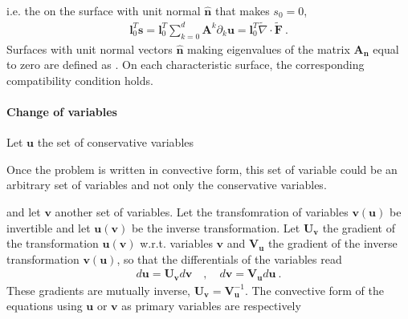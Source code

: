 \documentclass[letterpaper,10pt,english]{jupyterBook}
\begin{document}
\sphinxAtStartPar
i.e. the  on the surface with unit normal \(\hat{\mathbf{n}}\) that makes \(s_0 = 0\),
\begin{equation*}
\begin{split}\mathbf{l}_0^T \mathbf{s} = \mathbf{l}_0^T \sum_{k=0}^{d} \mathbf{A}^k \partial_k \mathbf{u} = \mathbf{l}_0^T \widetilde{\nabla} \cdot \widetilde{\mathbf{F}} \ .\end{split}
\end{equation*}
\sphinxAtStartPar
Surfaces with unit normal vectors \(\hat{\mathbf{n}}\) making eigenvalues of the matrix \(\mathbf{A}_{\mathbf{n}}\) equal to zero are defined as . On each characteristic surface, the corresponding compatibility condition holds.


\paragraph{Change of variables}
\label{\detokenize{ch/pde/hyperbolic-nd-draft:change-of-variables}}\label{\detokenize{ch/pde/hyperbolic-nd-draft:pde-hyperbolic-nd-draft-characteristics-spectrum-change-vars}}
\sphinxAtStartPar
Let \(\mathbf{u}\) the set of conservative variables%
\begin{footnote}[1]\sphinxAtStartFootnote
Once the problem is written in convective form, this set of variable could be an arbitrary set of variables and not only the conservative variables.
%
\end{footnote} and let \(\mathbf{v}\) another set of variables. Let the transfomration of variables \(\mathbf{v}(\mathbf{u})\) be invertible and let \(\mathbf{u}(\mathbf{v})\) be the inverse transformation. Let \(\mathbf{U}_{\mathbf{v}}\) the gradient of the transformation \(\mathbf{u}(\mathbf{v})\) w.r.t. variables \(\mathbf{v}\) and \(\mathbf{V}_{\mathbf{u}}\) the gradient of the inverse transformation \(\mathbf{v}(\mathbf{u})\), so that the differentials of the variables read
\begin{equation*}
\begin{split}d \mathbf{u} = \mathbf{U}_{\mathbf{v}} d \mathbf{v} \quad , \quad d \mathbf{v} = \mathbf{V}_{\mathbf{u}} d \mathbf{u} \ .\end{split}
\end{equation*}
\sphinxAtStartPar
These gradients are mutually inverse, \(\mathbf{U}_{\mathbf{v}} = \mathbf{V}^{-1}_{\mathbf{u}}\).
The convective form of the equations using \(\mathbf{u}\) or \(\mathbf{v}\) as primary variables are respectively
\end{document}
